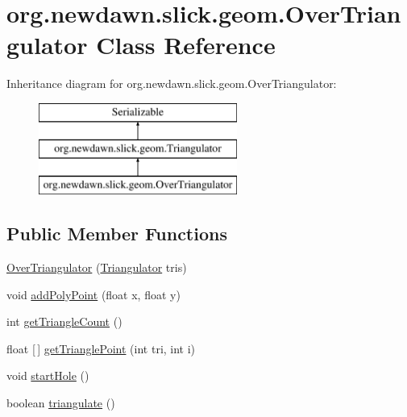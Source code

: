 \hypertarget{classorg_1_1newdawn_1_1slick_1_1geom_1_1_over_triangulator}{}\section{org.\+newdawn.\+slick.\+geom.\+Over\+Triangulator Class Reference}
\label{classorg_1_1newdawn_1_1slick_1_1geom_1_1_over_triangulator}
Inheritance diagram for org.\+newdawn.\+slick.\+geom.\+Over\+Triangulator\+:\begin{figure}[H]
\begin{center}
\leavevmode
\includegraphics[height=3.000000cm]{classorg_1_1newdawn_1_1slick_1_1geom_1_1_over_triangulator}
\end{center}
\end{figure}
\subsection*{Public Member Functions}
\begin{DoxyCompactItemize}
\item 
\mbox{\hyperlink{classorg_1_1newdawn_1_1slick_1_1geom_1_1_over_triangulator_a0ad4c088ff134dbc7ac735949509e18a}{Over\+Triangulator}} (\mbox{\hyperlink{interfaceorg_1_1newdawn_1_1slick_1_1geom_1_1_triangulator}{Triangulator}} tris)
\item 
void \mbox{\hyperlink{classorg_1_1newdawn_1_1slick_1_1geom_1_1_over_triangulator_a6a17184e4004dd942f52d5b150369e86}{add\+Poly\+Point}} (float x, float y)
\item 
int \mbox{\hyperlink{classorg_1_1newdawn_1_1slick_1_1geom_1_1_over_triangulator_a465acf51a252501448c8f29fa05c07ce}{get\+Triangle\+Count}} ()
\item 
float \mbox{[}$\,$\mbox{]} \mbox{\hyperlink{classorg_1_1newdawn_1_1slick_1_1geom_1_1_over_triangulator_ab101143b175d129d50115b7135e2cdf4}{get\+Triangle\+Point}} (int tri, int i)
\item 
void \mbox{\hyperlink{classorg_1_1newdawn_1_1slick_1_1geom_1_1_over_triangulator_afc94b0bfad20289f2d9988621b602aca}{start\+Hole}} ()
\item 
boolean \mbox{\hyperlink{classorg_1_1newdawn_1_1slick_1_1geom_1_1_over_triangulator_aabce5b7a47ea28da8332d0d3c546269b}{triangulate}} ()
\end{DoxyCompactItemize}
